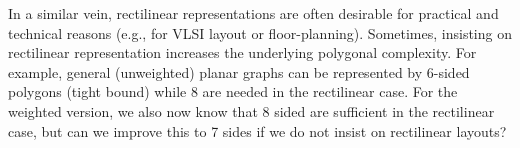 \documentclass[11pt]{article}
\begin{document}
In a similar vein, rectilinear representations are often desirable for
practical and technical reasons (e.g., for VLSI layout or
floor-planning). Sometimes, insisting on rectilinear representation
increases the underlying polygonal complexity. For example, general
(unweighted) planar graphs can be represented by 6-sided polygons (tight
bound) while 8 are needed in the rectilinear case. For the weighted
version, we also now know that 8 sided are sufficient in the
rectilinear case, but can we improve this to 7 sides if we do not
insist on rectilinear layouts?












{

}
\end{document}
